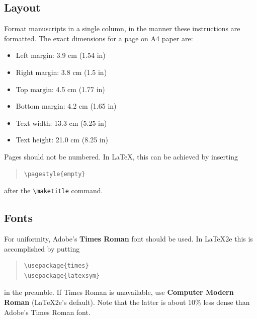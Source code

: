 \documentclass[]{article}
\begin{document}
\subsection{Layout}
\label{ssec:layout}

Format manuscripts in a single column, in the manner these
instructions are formatted. The exact dimensions for a page on
A4 paper are:
\begin{itemize}
\item Left margin: 3.9 cm (1.54 in)
\item Right margin: 3.8 cm (1.5 in)
\item Top margin: 4.5 cm (1.77 in)
\item Bottom margin: 4.2 cm (1.65 in)
\item Text width: 13.3 cm (5.25 in)
\item Text height: 21.0 cm (8.25 in)
\end{itemize}

Pages should not be numbered. In LaTeX, this can be achieved by
inserting
\begin{quote}
\begin{verbatim}
\pagestyle{empty}
\end{verbatim}
\end{quote}
after the \verb=\maketitle= command.

\subsection{Fonts}

For uniformity, Adobe's {\bf Times Roman} font should be
used. In \LaTeX2e{} this is accomplished by putting

\begin{quote}
\begin{verbatim}
\usepackage{times}
\usepackage{latexsym}
\end{verbatim}
\end{quote}
in the preamble. If Times Roman is unavailable, use {\bf Computer
  Modern Roman} (\LaTeX2e{}'s default).  Note that the latter is about
  10\% less dense than Adobe's Times Roman font.
\end{document}
